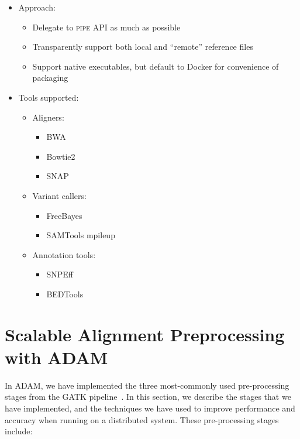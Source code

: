 \documentclass[phd]{ucbthesis}
\begin{document}
\begin{itemize}
\item Approach:
  \begin{itemize}
  \item Delegate to \textsc{pipe} API as much as possible
  \item Transparently support both local and ``remote'' reference files
  \item Support native executables, but default to Docker for convenience of packaging
  \end{itemize}
\item Tools supported:
  \begin{itemize}
  \item Aligners:
    \begin{itemize}
    \item BWA
    \item Bowtie2
    \item SNAP
    \end{itemize}
  \item Variant callers:
    \begin{itemize}
    \item FreeBayes
    \item SAMTools mpileup
    \end{itemize}
  \item Annotation tools:
    \begin{itemize}
    \item SNPEff
    \item BEDTools
    \end{itemize}
  \end{itemize}
\end{itemize}

\chapter{Scalable Alignment Preprocessing with \textsc{ADAM}}
\label{chap:adam}

In \textsc{ADAM}, we have implemented the three most-commonly used pre-processing stages from the
\textsc{GATK} pipeline~\cite{depristo11}. In this section, we describe the stages that we have
implemented, and the techniques we have used to improve performance and accuracy when running on
a distributed system. These pre-processing stages include:
\end{document}
